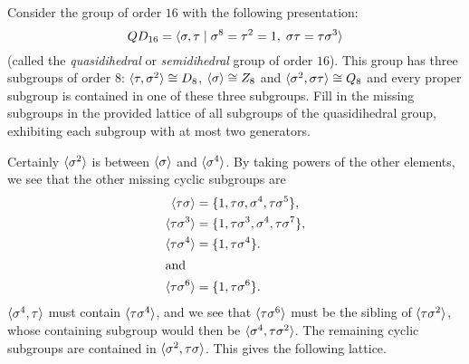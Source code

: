  Consider the group of order $16$ with the following
presentation:
\begin{equation*}
  QD_{16} = \langle{\sigma,\tau \mid \sigma^8 = \tau^2 = 1,\;
    \sigma\tau = \tau\sigma^3}\rangle
\end{equation*}
(called the {\em quasidihedral} or {\em semidihedral} group of order
$16$). This group has three subgroups of order $8$:
$\langle{\tau,\sigma^2}\rangle\cong D_8$, $\langle{\sigma}\rangle \cong Z_8$ and
$\langle{\sigma^2,\sigma\tau}\rangle\cong Q_8$ and every proper subgroup is
contained in one of these three subgroups. Fill in the missing
subgroups in the provided lattice of all subgroups of the
quasidihedral group, exhibiting each subgroup with at most two
generators.
\label{exercise:lattice:QD16}
\begin{solution}
  Certainly $\langle{\sigma^2}\rangle$ is between $\langle{\sigma}\rangle$ and
  $\langle{\sigma^4}\rangle$. By taking powers of the other elements, we see
  that the other missing cyclic subgroups are
  \begin{align*}
    \langle{\tau\sigma}\rangle &= \{1, \tau\sigma, \sigma^4, \tau\sigma^5\}, \\
    \langle{\tau\sigma^3}\rangle &= \{1, \tau\sigma^3, \sigma^4, \tau\sigma^7\}, \\
    \langle{\tau\sigma^4}\rangle &= \{1, \tau\sigma^4\}. \\\intertext{and}
    \langle{\tau\sigma^6}\rangle &= \{1, \tau\sigma^6\}.
  \end{align*}
  $\langle{\sigma^4,\tau}\rangle$ must contain $\langle{\tau\sigma^4}\rangle$, and we see
  that $\langle{\tau\sigma^6}\rangle$ must be the sibling of
  $\langle{\tau\sigma^2}\rangle$, whose containing subgroup would then be
  $\langle{\sigma^4, \tau\sigma^2}\rangle$. The remaining cyclic subgroups are
  contained in $\langle{\sigma^2, \tau\sigma}\rangle$. This gives the following
  lattice.
  \begin{center}
\end{center}
\end{solution}
